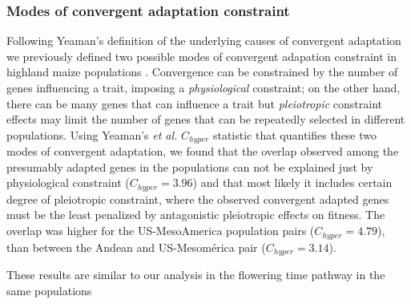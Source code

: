 \documentclass[9pt,twocolumn,twoside,lineno]{BioRxiv}
\begin{document}
\subsubsection{Modes of convergent adaptation constraint} 
Following Yeaman's \cite{yeaman2018} definition of the underlying causes of convergent adaptation we previously defined two possible modes of convergent adapation constraint in highland maize populations \cite{Wang2020-mp}. 
Convergence can be constrained by the number of genes influencing a trait, imposing a \textit{physiological} constraint; on the other hand, there can be many genes that can influence a trait but \textit{pleiotropic} constraint effects may limit the number of genes that can be repeatedly selected in different populations. 
Using Yeaman's \textit{et al.} $C_{hyper}$ statistic \cite{yeaman2018} that quantifies these two modes of convergent adaptation, we found that the overlap observed among the presumably adapted genes in the populations can not be explained just by physiological constraint ($C_{hyper} = 3.96$) and that most likely it includes certain degree of pleiotropic constraint, where the observed convergent adapted genes must be the least penalized by antagonistic pleiotropic effects on fitness.
The overlap was higher for the US-MesoAmerica population pairs ($C_{hyper} = 4.79$), than between the Andean and US-Mesomérica pair ($C_{hyper} = 3.14$).

These results are similar to our analysis in the flowering time pathway in the same populations \cite{Wang2020-mp} 
\end{document}
